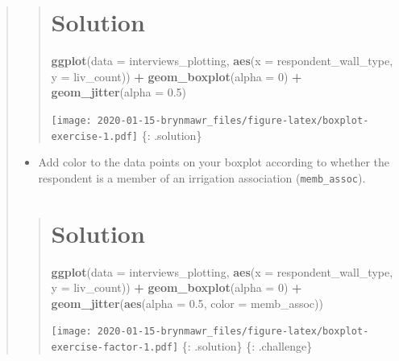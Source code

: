 \documentclass[]{book}
\newenvironment{Shaded}{\begin{snugshade}}{\end{snugshade}}
\newcommand{\KeywordTok}[1]{\textcolor[rgb]{0.13,0.29,0.53}{\textbf{#1}}}
\newcommand{\DataTypeTok}[1]{\textcolor[rgb]{0.13,0.29,0.53}{#1}}
\newcommand{\DecValTok}[1]{\textcolor[rgb]{0.00,0.00,0.81}{#1}}
\newcommand{\FloatTok}[1]{\textcolor[rgb]{0.00,0.00,0.81}{#1}}
\newcommand{\StringTok}[1]{\textcolor[rgb]{0.31,0.60,0.02}{#1}}
\newcommand{\OperatorTok}[1]{\textcolor[rgb]{0.81,0.36,0.00}{\textbf{#1}}}
\newcommand{\NormalTok}[1]{#1}
\providecommand{\tightlist}{%
  \setlength{\itemsep}{0pt}\setlength{\parskip}{0pt}}
\begin{document}
\begin{quote}
\begin{quote}
\section{Solution}\label{solution-18}

\begin{Shaded}
\begin{Highlighting}[]
\KeywordTok{ggplot}\NormalTok{(}\DataTypeTok{data =}\NormalTok{ interviews_plotting, }\KeywordTok{aes}\NormalTok{(}\DataTypeTok{x =}\NormalTok{ respondent_wall_type, }\DataTypeTok{y =}\NormalTok{ liv_count)) }\OperatorTok{+}
\StringTok{  }\KeywordTok{geom_boxplot}\NormalTok{(}\DataTypeTok{alpha =} \DecValTok{0}\NormalTok{) }\OperatorTok{+}
\StringTok{  }\KeywordTok{geom_jitter}\NormalTok{(}\DataTypeTok{alpha =} \FloatTok{0.5}\NormalTok{)}
\end{Highlighting}
\end{Shaded}

\texttt{[image: 2020-01-15-brynmawr\_files/figure-latex/boxplot-exercise-1.pdf]}
\{: .solution\}
\end{quote}

\begin{itemize}
\tightlist
\item
  Add color to the data points on your boxplot according to whether the
  respondent is a member of an irrigation association
  (\texttt{memb\_assoc}).
\end{itemize}

\begin{quote}
\section{Solution}\label{solution-19}

\begin{Shaded}
\begin{Highlighting}[]
\KeywordTok{ggplot}\NormalTok{(}\DataTypeTok{data =}\NormalTok{ interviews_plotting, }\KeywordTok{aes}\NormalTok{(}\DataTypeTok{x =}\NormalTok{ respondent_wall_type, }\DataTypeTok{y =}\NormalTok{ liv_count)) }\OperatorTok{+}
\StringTok{  }\KeywordTok{geom_boxplot}\NormalTok{(}\DataTypeTok{alpha =} \DecValTok{0}\NormalTok{) }\OperatorTok{+}
\StringTok{  }\KeywordTok{geom_jitter}\NormalTok{(}\KeywordTok{aes}\NormalTok{(}\DataTypeTok{alpha =} \FloatTok{0.5}\NormalTok{, }\DataTypeTok{color =}\NormalTok{ memb_assoc))}
\end{Highlighting}
\end{Shaded}

\texttt{[image: 2020-01-15-brynmawr\_files/figure-latex/boxplot-exercise-factor-1.pdf]}
\{: .solution\} \{: .challenge\}
\end{quote}
\end{quote}
\end{document}
